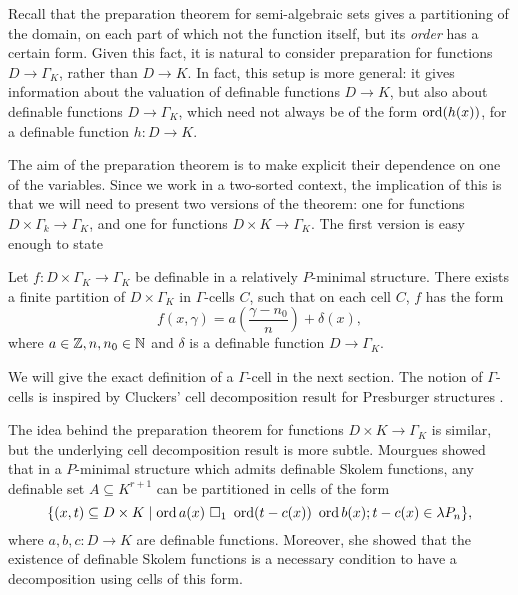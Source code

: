 Recall that the preparation theorem for semi-algebraic sets gives a partitioning of the domain, on each part of which not the function itself, but its \emph{order} has a certain form. Given this fact, it is natural to consider preparation for functions $D \to \Gamma_K$, rather than $D \to K$. 
In fact, this setup is more general: it gives information about the valuation of definable functions $D \to K$, but also about definable functions $D \to \Gamma_K$, which need not always be of the form $\operatorname{ord}(h(x))$, for a definable function $h: D\to K$.

The aim of the preparation theorem is to make explicit their dependence on one of the variables. Since we work in a two-sorted context, the implication of this is that we will need to present two versions of the theorem: one for functions $D\times \Gamma_k \to \Gamma_K$, and one for functions $D\times K \to \Gamma_K$.
The first version is easy enough to state
\begin{thm*}
Let $f: D\times \Gamma_K \to \Gamma_K$ be definable in a relatively $P$-minimal structure. There exists a finite partition of $D \times \Gamma_K$ in $\Gamma$-cells $C$, such that on each cell $C$, $f$ has the form
\[f(x,\gamma) = a\left(\frac{\gamma-n_0}{n}\right) + \delta(x),\]
where $a \in {\mathbb Z}, n,n_0 \in {\mathbb N}$ and $\delta$ is a definable function $D\to \Gamma_K$. 
\end{thm*}
We will give the exact definition of a $\Gamma$-cell in the next section. The notion of $\Gamma$-cells is inspired by Cluckers' cell decomposition result for Presburger structures \cite{clu-presb03}.  %

The idea behind the preparation theorem for functions $D \times K \to \Gamma_K$ is similar, but the underlying cell decomposition result is more subtle. Mourgues \cite{mou-09} showed that in a $P$-minimal structure which admits definable Skolem functions, any definable set $A \subseteq K^{r+1}$ can be partitioned in cells of the form
\[\{(x,t) \subseteq D\times K\mid \ord a(x) \ \square_1 \ \ord(t-c(x)) \ \ord b(x); t-c(x) \in \lambda P_n\},\]
where $a,b,c: D\to K$ are definable functions. Moreover, she showed that the existence of definable Skolem functions is a necessary condition to have a decomposition using cells of this form.

